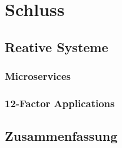 \chapter{Schluss}

\section{Reative Systeme}
\subsection{Microservices}
\subsection{12-Factor Applications}

\section{Zusammenfassung}
